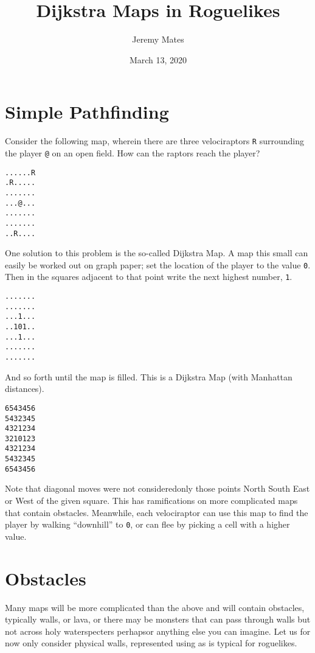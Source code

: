 \documentclass[12pt,a4paper]{article}
\title{Dijkstra Maps in Roguelikes}
\author{Jeremy Mates}
\date{March 13, 2020}
\begin{document}

\maketitle

\setlength{\parindent}{0pt}

\section*{Simple Pathfinding}

Consider the following map, wherein there are three velociraptors
\texttt{R} surrounding the player \texttt{@} on an open
field\cite{xkcd135}. How can the raptors reach the player?

\begin{verbatim}
......R
.R.....
.......
...@...
.......
.......
..R....
\end{verbatim}

One solution to this problem is the so-called Dijkstra Map\cite{tipodm}.
A map this small can easily be worked out on graph paper; set the
location of the player to the value \texttt{0}. Then in the squares
adjacent to that point write the next highest number, \texttt{1}.

\begin{verbatim}
.......
.......
...1...
..101..
...1...
.......
.......
\end{verbatim}

And so forth until the map is filled. This is a Dijkstra Map (with
Manhattan distances).

\begin{verbatim}
6543456
5432345
4321234
3210123
4321234
5432345
6543456
\end{verbatim}

Note that diagonal moves were not considered\textendash only those
points North South East or West of the given square. This has
ramifications on more complicated maps that contain obstacles.
Meanwhile, each velociraptor can use this map to find the player by
walking ``downhill'' to \texttt{0}, or can flee by picking a cell with a
higher value.

\section*{Obstacles}

Many maps will be more complicated than the above and will contain
obstacles, typically walls, or lava, or there may be monsters that can
pass through walls but not across holy water\textendash specters
perhaps\textendash or anything else you can imagine. Let us for now
only consider physical walls, represented using \texttt{} as
is typical for roguelikes.
\end{document}
